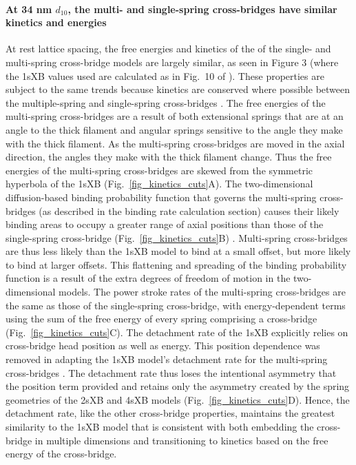 \documentclass[10pt]{article}
\newcommand{\citep}[1]{\cite{#1}} %
\newcommand{\citet}[1]{\cite{#1}}
\begin{document}
\paragraph{At 34 nm $d_{10}$, the multi- and single-spring cross-bridges have similar kinetics and energies} %
At rest lattice spacing, the free energies and kinetics of the of the single- and multi-spring cross-bridge models are largely similar, as seen in Figure 3 (where the 1sXB values used are calculated as in Fig.~10 of \citet{Tanner2007}).  
These properties are subject to the same trends because kinetics are conserved where possible between the multiple-spring and single-spring cross-bridges \citep{Pate1989}.
The free energies of the multi-spring cross-bridges are a result of both extensional springs that are at an angle to the thick filament and angular springs sensitive to the angle they make with the thick filament. 
As the multi-spring cross-bridges are moved in the axial direction, the angles they make with the thick filament change. 
Thus the free energies of the multi-spring cross-bridges are skewed from the symmetric hyperbola of the 1sXB (Fig.~\ref{fig_kinetics_cuts}A).
The two-dimensional diffusion-based binding probability function that governs the multi-spring cross-bridges (as described in the binding rate calculation section) causes their likely binding areas to occupy a greater range of axial positions than those of the single-spring cross-bridge (Fig.~\ref{fig_kinetics_cuts}B) \citep{BergBook, DillBook}.
Multi-spring cross-bridges are thus less likely than the 1sXB model to bind at a small offset, but more likely to bind at larger offsets. 
This flattening and spreading of the binding probability function is a result of the extra degrees of freedom of motion in the two-dimensional models. 
The power stroke rates of the multi-spring cross-bridges are the same as those of the single-spring cross-bridge, with energy-dependent terms using the sum of the free energy of every spring comprising a cross-bridge (Fig.~\ref{fig_kinetics_cuts}C). 
The detachment rate of the 1sXB explicitly relies on cross-bridge head position as well as energy.
This position dependence was removed in adapting the 1sXB model's detachment rate for the multi-spring cross-bridges . 
The detachment rate thus loses the intentional asymmetry that the position term provided and retains only the asymmetry created by the spring geometries of the 2sXB and 4sXB models (Fig.~\ref{fig_kinetics_cuts}D). 
Hence, the detachment rate, like the other cross-bridge properties, maintains the greatest similarity to the 1sXB model that is consistent with both embedding the cross-bridge in multiple dimensions and transitioning to kinetics based on the free energy of the cross-bridge. 
\end{document}

